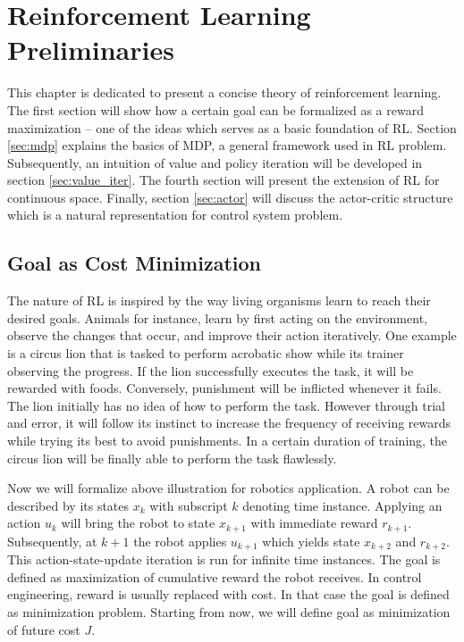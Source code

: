 \chapter{Reinforcement Learning Preliminaries}
This chapter is dedicated to present a concise theory of reinforcement learning. The first section will show how a certain goal can be formalized as a reward maximization -- one of the ideas which serves as a basic foundation of \ac{RL}. Section \ref{sec:mdp} explains the basics of \ac{MDP}, a general framework used in \ac{RL} problem. Subsequently, an intuition of value and policy iteration will be developed in section \ref{sec:value_iter}. The fourth section will present the extension of \ac{RL} for continuous space. Finally, section \ref{sec:actor} will discuss the actor-critic structure which is a natural representation for control system problem.

\section{Goal as Cost Minimization}
The nature of \ac{RL} is inspired by the way living organisms learn to reach their desired goals. Animals for instance, learn by first acting on the environment, observe the changes that occur, and improve their action iteratively. One example is a circus lion that is tasked to perform acrobatic show while its trainer observing the progress. If the lion successfully executes the task, it will be rewarded with foods. Conversely, punishment will be inflicted whenever it fails. The lion initially has no idea of how to perform the task. However through trial and error, it will follow its instinct to increase the frequency of receiving rewards while trying its best to avoid punishments. In a certain duration of training, the circus lion will be finally able to perform the task flawlessly. 

Now we will formalize above illustration for robotics application. A robot can be described by its states $x_k$ with subscript $k$ denoting time instance. Applying an action $u_k$ will bring the robot to state $x_{k+1}$ with immediate reward $r_{k+1}$. Subsequently, at $k+1$ the robot applies $u_{k+1}$ which yields state $x_{k+2}$ and $r_{k+2}$. This action-state-update iteration is run for infinite time instances. The goal is defined as maximization of cumulative reward the robot receives. In control engineering, reward is usually replaced with cost. In that case the goal is defined as minimization problem. Starting from now, we will define goal as minimization of future cost $J$.

